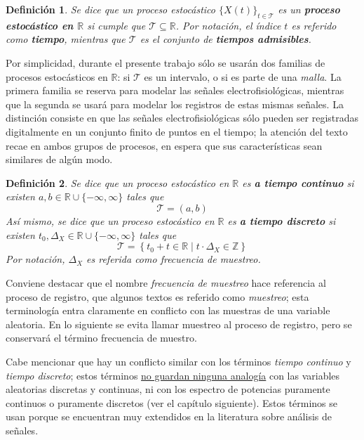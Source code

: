\documentclass[12pt,letterpaper]{book}
\newtheorem{definicion}{Definición}[chapter]
\newcommand{\R}{\mathbb{R}}
\newcommand{\Z}{\mathbb{Z}}
\newcommand{\xt}{$\{X(t)\}_{t\in \mathcal{T}}$ }
\newcommand{\talque}{\mathrel{}\middle|\mathrel{}}
\begin{document}
\begin{definicion}
Se dice que un proceso estocástico \xt es un \textbf{proceso estocástico en $\R$} si cumple que $\mathcal{T} \subseteq \R$.
%
Por notación, el índice $t$ es referido como \textbf{tiempo}, mientras que $\mathcal{T}$ es el conjunto de \textbf{tiempos admisibles}.
\end{definicion}

Por simplicidad, durante el presente trabajo sólo se usarán dos familias de procesos estocásticos en $\R$: si $\mathcal{T}$ es un intervalo, o si es parte de una \textit{malla}. 
%
La primera familia se reserva para modelar las señales electrofisiológicas, mientras que la segunda se usará para modelar los registros de estas mismas señales.
%
La distinción consiste en que las señales electrofisiológicas sólo pueden ser registradas digitalmente en un conjunto finito de puntos en el tiempo; la atención del texto recae en ambos grupos de procesos, en espera que sus características sean similares de algún modo.

\begin{definicion}
Se dice que un proceso estocástico en $\R$ es \textbf{a tiempo continuo} si existen $a, b \in \R \cup \{ -\infty, \infty \}$ tales que
\begin{equation}
\mathcal{T} = (a,b)
\end{equation}
Así mismo, se dice que un proceso estocástico en $\R$ es \textbf{a tiempo discreto} si existen $t_0, \Delta_X \in \R \cup \{ -\infty, \infty \}$ tales que
\begin{equation}
\mathcal{T} = \left\{ t_0 + t \in \R \talque {t} \cdot {\Delta_X} \in \Z \right\}
\end{equation}
Por notación, $\Delta_X$ es referida como \textit{frecuencia de muestreo}.
\end{definicion}

Conviene destacar que el nombre \textit{frecuencia de muestreo} hace referencia al proceso de registro, que algunos textos es referido como \textit{muestreo}; esta terminología entra claramente en conflicto con las muestras de una variable aleatoria. En lo siguiente se evita llamar muestreo al proceso de registro, pero se conservará el término frecuencia de muestro.

Cabe mencionar que hay un conflicto similar con los términos \textit{tiempo continuo} y \textit{tiempo discreto}; estos términos \underline{no guardan ninguna analogía} con las variables aleatorias discretas y continuas, ni con los espectro de potencias puramente continuos o puramente discretos (ver el capítulo siguiente).
%
Estos términos se usan porque se encuentran muy extendidos en la literatura sobre análisis de señales.
\end{document}
